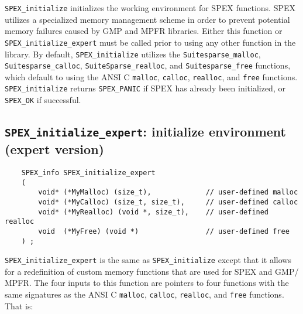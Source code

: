 \documentclass[12pt,oneside]{book}
\theoremstyle{definition}
\begin{document}
\verb|SPEX_initialize| initializes the working environment for SPEX
functions.  SPEX utilizes a specialized memory management scheme in order to
prevent potential memory failures caused by GMP and MPFR libraries.  Either
this function or \verb|SPEX_initialize_expert| must be called prior to using
any other function in the library.  By default, \verb|SPEX_initialize| utilizes 
the \verb'Suitesparse_malloc', \verb'Suitesparse_calloc', \verb'SuiteSparse_realloc', and \newline 
\verb'Suitesparse_free' functions, which default to using the ANSI C \verb'malloc', \verb'calloc', \verb'realloc', and \verb'free' functions. \verb'SPEX_initialize' returns \verb|SPEX_PANIC| 
if SPEX has already been initialized, or \verb|SPEX_OK| if successful.


\subsection{\texttt{SPEX\_initialize\_expert}: initialize environment (expert version)} \label{ss:SPEX_initialize_expert}
\begin{mdframed}[userdefinedwidth=\textwidth]
{\footnotesize
\begin{verbatim}
    SPEX_info SPEX_initialize_expert
    (
        void* (*MyMalloc) (size_t),             // user-defined malloc
        void* (*MyCalloc) (size_t, size_t),     // user-defined calloc
        void* (*MyRealloc) (void *, size_t),    // user-defined realloc
        void  (*MyFree) (void *)                // user-defined free
    ) ;
\end{verbatim}
} \end{mdframed}

\verb|SPEX_initialize_expert| is the same as \verb|SPEX_initialize| except that
it allows for a redefinition of custom memory functions that are used for SPEX
and GMP/ MPFR.  The four inputs to this function are pointers to four
functions with the same signatures as the ANSI C \verb'malloc', \verb'calloc',
\verb'realloc', and \verb'free' functions.  That is:
\end{document}
